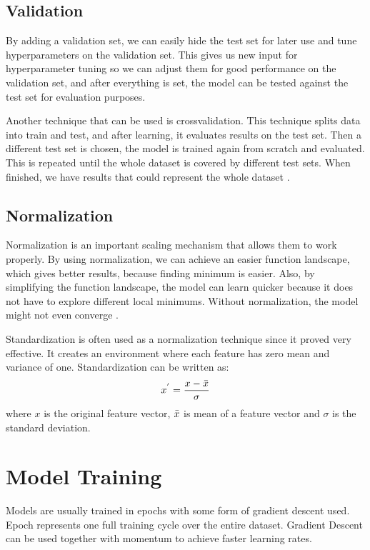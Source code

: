 \documentclass[thesis=B,english]{FITthesis}[2019/12/23]
\begin{document}
\subsection{Validation}    
    By adding a validation set, we can easily hide the test set for later use and tune hyperparameters on the validation set. This gives us new input for hyperparameter tuning so we can adjust them for good performance on the validation set, and after everything is set, the model can be tested against the test set for evaluation purposes.
    
    Another technique that can be used is crossvalidation. This technique splits data into train and test, and after learning, it evaluates results on the test set. Then a different test set is chosen, the model is trained again from scratch and evaluated. This is repeated until the whole dataset is covered by different test sets. When finished, we have results that could represent the whole dataset \cite{browne2000cross}.

  
\subsection{Normalization}
    Normalization is an important scaling mechanism that allows them to work properly. By using normalization, we can achieve an easier function landscape, which gives better results, because finding minimum is easier. Also, by simplifying the function landscape, the model can learn quicker because it does not have to explore different local minimums. Without normalization, the model might not even converge \cite{bengio2017deep}.
    
    Standardization is often used as a normalization technique since it proved very effective. It creates an environment where each feature has zero mean and variance of one. Standardization can be written as:
    $$x^{'} = \frac{x - \Bar{x}}{\sigma}$$
    where $x$ is the original feature vector, $\Bar{x}$ is mean of a feature vector and $\sigma$ is the standard deviation.

\section{Model Training}
    Models are usually trained in epochs with some form of gradient descent used. Epoch represents one full training cycle over the entire dataset. Gradient Descent can be used together with momentum to achieve faster learning rates.
\end{document}
